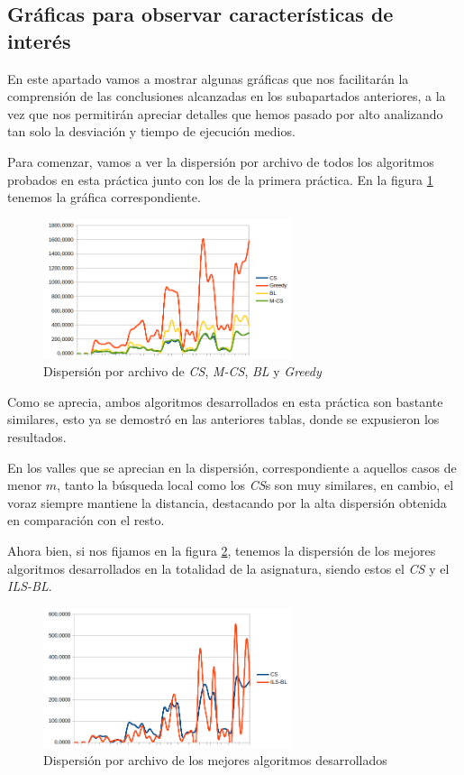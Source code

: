 \subsection{Gráficas para observar características de interés}

En este apartado vamos a mostrar algunas gráficas que nos facilitarán la comprensión de las conclusiones alcanzadas en los subapartados anteriores, a la vez que nos permitirán apreciar detalles que hemos pasado por alto analizando tan solo la desviación y tiempo de ejecución medios.

Para comenzar, vamos a ver la dispersión por archivo de todos los algoritmos probados en esta práctica junto con los de la primera práctica. En la figura \ref{fig:dispPrimeros} tenemos la gráfica correspondiente.

\begin{figure}[H]
    \centering
    \includegraphics[width=0.65\textwidth]{"data/disp_primeros.png"}
    \caption{Dispersión por archivo de \textit{CS}, \textit{M-CS}, \textit{BL} y \textit{Greedy}}
    \label{fig:dispPrimeros}
\end{figure}

Como se aprecia, ambos algoritmos desarrollados en esta práctica son bastante similares, esto ya se demostró en las anteriores tablas, donde se expusieron los resultados.

En los valles que se aprecian en la dispersión, correspondiente a aquellos casos de menor $m$, tanto la búsqueda local como los \textit{CS}s son muy similares, en cambio, el voraz siempre mantiene la distancia, destacando por la alta dispersión obtenida en comparación con el resto.

Ahora bien, si nos fijamos en la figura \ref{fig:disp_mejores}, tenemos la dispersión de los mejores algoritmos desarrollados en la totalidad de la asignatura, siendo estos el \textit{CS} y el \textit{ILS-BL}.

\begin{figure}[H]
    \centering
    \includegraphics[width=0.65\textwidth]{"data/disp_mejores.png"}
    \caption{Dispersión por archivo de los mejores algoritmos desarrollados}
    \label{fig:disp_mejores}
\end{figure}

